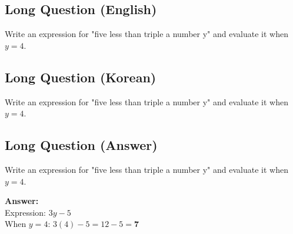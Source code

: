 \cleardoublepage
\subsection*{Long Question (English)}
Write an expression for "five less than triple a number y" and evaluate it when $y = 4$.


\newpage
\subsection*{Long Question (Korean)}
Write an expression for "five less than triple a number y" and evaluate it when $y = 4$.


\newpage
\subsection*{Long Question (Answer)}
Write an expression for "five less than triple a number y" and evaluate it when $y = 4$.

\textbf{Answer:}\\
Expression: $3y - 5$\\
When $y = 4$: $3(4) - 5 = 12 - 5 = \mathbf{7}$
